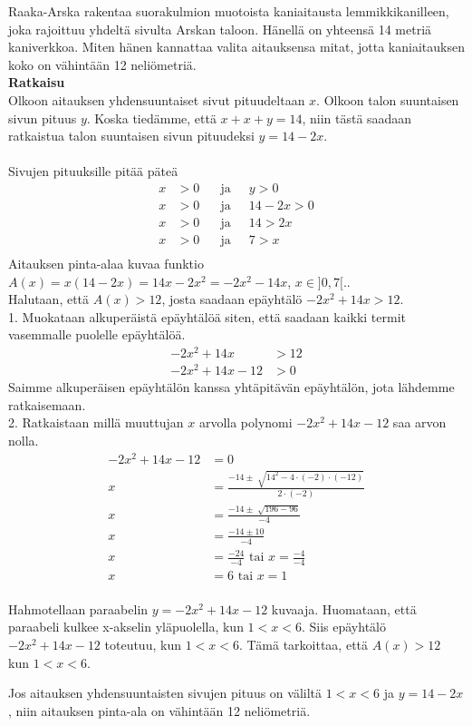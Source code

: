 \begin{esimerkki}
Raaka-Arska rakentaa suorakulmion muotoista kaniaitausta lemmikkikanilleen, joka rajoittuu yhdeltä sivulta Arskan taloon. Hänellä on yhteensä 14 metriä kaniverkkoa. Miten hänen kannattaa valita aitauksensa mitat, jotta kaniaitauksen koko on vähintään 12 neliömetriä. \\
\textbf{Ratkaisu}\\
Olkoon aitauksen yhdensuuntaiset sivut pituudeltaan $x$. Olkoon talon suuntaisen sivun pituus $y$. Koska tiedämme, että $x+x+y=14$, niin tästä saadaan ratkaistua talon suuntaisen sivun pituudeksi $y=14 - 2x$. \\ \\
Sivujen pituuksille pitää päteä
\begin{align*}
x&>0 \ \ \ \ \ \ \text{ ja } \ \ \ \ \ y>0 \\
x&>0 \ \ \ \ \ \ \text{ ja } \ \ \ \ \ 14-2x>0 \\ 
x&>0 \ \ \ \ \ \ \text{ ja } \ \ \ \ \ 14>2x \\ 
x&>0 \ \ \ \ \ \ \text{ ja } \ \ \ \ \ 7>x \\
\end{align*} 
Aitauksen pinta-alaa kuvaa funktio $A(x)=x(14-2x)=14x-2x^2=-2x^2-14x$, $x \in ]0,7[.$. \\
Halutaan, että $A(x)>12$, josta saadaan epäyhtälö $-2x^2+14x>12$. \\
1. Muokataan alkuperäistä epäyhtälöä siten, että saadaan kaikki termit vasemmalle puolelle epäyhtälöä.
\begin{align*}
-2x^2+14x&>12 \\
-2x^2+14x-12&>0
\end{align*}
Saimme alkuperäisen epäyhtälön kanssa yhtäpitävän epäyhtälön, jota lähdemme ratkaisemaan. \\
2. Ratkaistaan millä muuttujan $x$ arvolla polynomi $-2x^2+14x-12$ saa arvon nolla.
\begin{align*}
-2x^2+14x-12&=0 \\
x&=\frac{-14 \pm \sqrt[]{14^2-4 \cdot (-2) \cdot (-12)}}{2 \cdot (-2)} \\
x&=\frac{-14 \pm \sqrt[]{196-96}}{-4} \\
x&=\frac{-14 \pm 10}{-4} \\
x&=\frac{-24}{-4} \text{ tai } x=\frac{-4}{-4} \\
x&=6 \text{ tai } x=1
\end{align*}
 \\
Hahmotellaan paraabelin $y=-2x^2+14x-12$ kuvaaja. Huomataan, että paraabeli kulkee x-akselin yläpuolella, kun $1<x<6$. 
Siis epäyhtälö $-2x^2+14x-12$ toteutuu, kun $1<x<6$. Tämä tarkoittaa, että $A(x)>12$ kun $1<x<6$.

Jos aitauksen yhdensuuntaisten sivujen pituus on väliltä $1<x<6$ ja $y=14-2x$, niin aitauksen pinta-ala on vähintään 12 neliömetriä.
\end{esimerkki}
